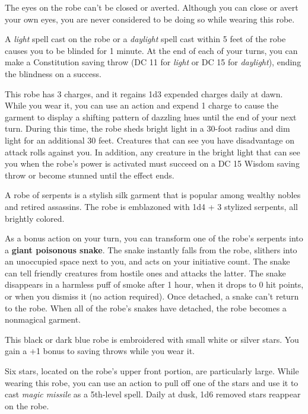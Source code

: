 \documentclass[10pt,a4paper,twoside,bg=print,twocolumn,openany,nodeprecatedcode]{dndbook}
\begin{document}
The eyes on the robe can't be closed or averted. Although you can close or avert your own eyes, you are never considered to be doing so while wearing this robe.

A \textit{light} spell cast on the robe or a \textit{daylight} spell cast within 5 feet of the robe causes you to be blinded for 1 minute. At the end of each of your turns, you can make a Constitution saving throw (DC 11 for \textit{light} or DC 15 for \textit{daylight}), ending the blindness on a success.

This robe has 3 charges, and it regains 1d3 expended charges daily at dawn. While you wear it, you can use an action and expend 1 charge to cause the garment to display a shifting pattern of dazzling hues until the end of your next turn. During this time, the robe sheds bright light in a 30-foot radius and dim light for an additional 30 feet. Creatures that can see you have disadvantage on attack rolls against you. In addition, any creature in the bright light that can see you when the robe's power is activated must succeed on a DC 15 Wisdom saving throw or become stunned until the effect ends.

A robe of serpents is a stylish silk garment that is popular among wealthy nobles and retired assassins. The robe is emblazoned with 1d4 + 3 stylized serpents, all brightly colored.

As a bonus action on your turn, you can transform one of the robe's serpents into a \textbf{giant poisonous snake}. The snake instantly falls from the robe, slithers into an unoccupied space next to you, and acts on your initiative count. The snake can tell friendly creatures from hostile ones and attacks the latter. The snake disappears in a harmless puff of smoke after 1 hour, when it drops to 0 hit points, or when you dismiss it (no action required). Once detached, a snake can't return to the robe. When all of the robe's snakes have detached, the robe becomes a nonmagical garment.

This black or dark blue robe is embroidered with small white or silver stars. You gain a +1 bonus to saving throws while you wear it.

Six stars, located on the robe's upper front portion, are particularly large. While wearing this robe, you can use an action to pull off one of the stars and use it to cast \textit{magic missile} as a 5th-level spell. Daily at dusk, 1d6 removed stars reappear on the robe.
\end{document}
